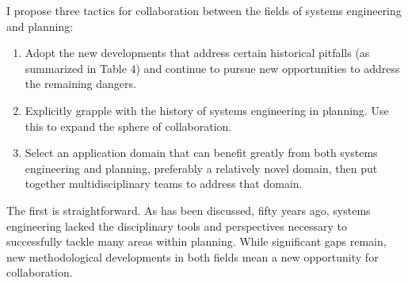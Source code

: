\restoregeometry

I propose three tactics for collaboration between the fields of systems engineering and planning:

\begin{enumerate} \setlength{\itemsep}{0pt} \setlength{\parskip}{0pt} 
	\item{Adopt the new developments that address certain historical pitfalls (as summarized in Table 4) and continue to pursue new opportunities to address the remaining dangers.}
	\item{Explicitly grapple with the history of systems engineering in planning. Use this to expand the sphere of collaboration.}
	\item{Select an application domain that can benefit greatly from both systems engineering and planning, preferably a relatively novel domain, then put together multidisciplinary teams to address that domain.}
\end{enumerate}

The first is straightforward. As has been discussed, fifty years ago, systems engineering lacked the disciplinary tools and perspectives necessary to successfully tackle many areas within planning. While significant gaps remain, new methodological developments in both fields mean a new opportunity for collaboration.


